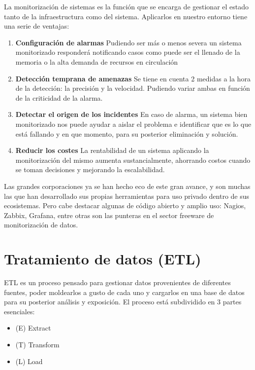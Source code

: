  La monitorización de sistemas\cite{Monitorización}\cite{Monitorización2}\cite{Monitorización3} es la función que se encarga de gestionar el estado tanto de la infraestructura como del sistema. Aplicarlos en nuestro entorno tiene una serie de ventajas: 
\begin{enumerate}
    \item \textbf{Configuración de alarmas}
            Pudiendo ser más o menos severa un sistema monitorizado responderá notificando casos como puede ser el llenado de la memoria o la alta demanda de recursos en circulación
    \item \textbf{Detección temprana de amenazas}
    Se tiene en cuenta 2 medidas a la hora de la detección: la precisión y la velocidad. Pudiendo variar ambas en función de la criticidad de la alarma.
    \item \textbf{Detectar el origen de los incidentes}
    En caso de alarma, un sistema bien monitorizado nos puede ayudar a aislar el problema e identificar que es lo que está fallando y en que momento, para su posterior eliminación y solución.
    \item \textbf{Reducir los costes}
    La rentabilidad de un sistema aplicando la monitorización del mismo aumenta sustancialmente, ahorrando costos cuando se toman decisiones y mejorando la escalabilidad.
\end{enumerate}

Las grandes corporaciones ya se han hecho eco de este gran avance, y son muchas las que han desarrollado sus propias herramientas para uso privado dentro de sus ecosistemas. Pero cabe destacar algunas de código abierto y amplio uso: Nagios, Zabbix, Grafana, entre otras son las punteras en el sector freeware de monitorización de datos.

\section{Tratamiento de datos (ETL)}

ETL\cite{wiki:ETL}\cite{ETL2} es un proceso pensado para gestionar datos provenientes de diferentes fuentes, poder moldearlos a gusto de cada uno y cargarlos en una base de datos para su posterior análisis y exposición. 
El proceso está subdividido en 3 partes esenciales:
    \begin{itemize}
        \item (E) Extract
        \item  (T) Transform
        \item (L) Load
    \end{itemize}

